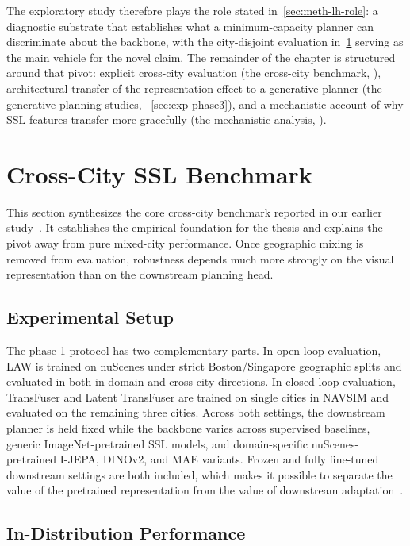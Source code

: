 The exploratory study therefore plays the role stated in~\ref{sec:meth-lh-role}: a diagnostic substrate that establishes what a minimum-capacity planner can discriminate about the backbone, with the city-disjoint evaluation in~\ref{sec:exp-phase1} serving as the main vehicle for the novel claim. The remainder of the chapter is structured around that pivot: explicit cross-city evaluation (the cross-city benchmark, ), architectural transfer of the representation effect to a generative planner (the generative-planning studies, --\ref{sec:exp-phase3}), and a mechanistic account of why SSL features transfer more gracefully (the mechanistic analysis, ).

\section{Cross-City SSL Benchmark}
\label{sec:exp-phase1}

This section synthesizes the core cross-city benchmark reported in our earlier study~\cite{naeinian-cross-city-2026}. It establishes the empirical foundation for the thesis and explains the pivot away from pure mixed-city performance. Once geographic mixing is removed from evaluation, robustness depends much more strongly on the visual representation than on the downstream planning head.

\subsection{Experimental Setup}
The phase-1 protocol has two complementary parts. In open-loop evaluation, LAW is trained on nuScenes under strict Boston/Singapore geographic splits and evaluated in both in-domain and cross-city directions. In closed-loop evaluation, TransFuser and Latent TransFuser are trained on single cities in NAVSIM and evaluated on the remaining three cities. Across both settings, the downstream planner is held fixed while the backbone varies across supervised baselines, generic ImageNet-pretrained SSL models, and domain-specific nuScenes-pretrained I-JEPA, DINOv2, and MAE variants. Frozen and fully fine-tuned downstream settings are both included, which makes it possible to separate the value of the pretrained representation from the value of downstream adaptation~\cite{naeinian-cross-city-2026}.

\subsection{In-Distribution Performance}
\label{sec:exp-phase1-indist}

